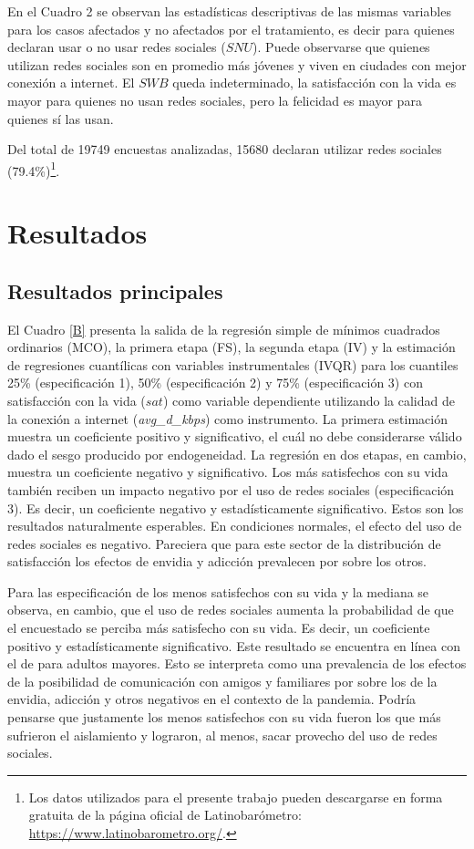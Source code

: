 \documentclass[11pt]{article}
\begin{document}


En el Cuadro 2 se observan las estadísticas descriptivas de las mismas variables para los casos afectados y no afectados por el tratamiento, es decir para quienes declaran usar o no usar redes sociales ($SNU$). Puede observarse que quienes utilizan redes sociales son en promedio más jóvenes y viven en ciudades con mejor conexión a internet. El $SWB$ queda indeterminado, la satisfacción con la vida es mayor para quienes no usan redes sociales, pero la felicidad es mayor para quienes sí las usan. 

Del total de 19749 encuestas analizadas, 15680 declaran utilizar redes sociales (79.4\%)\footnote{Los datos utilizados para el presente trabajo pueden descargarse en forma gratuita de la página oficial de Latinobarómetro: \url{https://www.latinobarometro.org/}.}. 



\section{Resultados}

\subsection{Resultados principales}

El Cuadro \ref{B} presenta la salida de la regresión simple de mínimos cuadrados ordinarios (MCO), la primera etapa (FS), la segunda etapa (IV) y la estimación de regresiones cuantílicas con variables instrumentales (IVQR) para los cuantiles 25\% (especificación 1), 50\% (especificación 2) y 75\% (especificación 3) con satisfacción con la vida ($sat$) como variable dependiente utilizando la calidad de la conexión a internet (\textit{avg\_d\_kbps}) como instrumento. La primera estimación muestra un coeficiente positivo y significativo, el cuál no debe considerarse válido dado el sesgo producido por endogeneidad. La regresión en dos etapas, en cambio, muestra un coeficiente negativo y significativo. Los más satisfechos con su vida también reciben un impacto negativo por el uso de redes sociales (especificación 3). Es decir, un coeficiente negativo y estadísticamente significativo. Estos son los resultados naturalmente esperables. En condiciones normales, el efecto del uso de redes sociales es negativo. Pareciera que para este sector de la distribución de satisfacción los efectos de envidia y adicción prevalecen por sobre los otros. 

Para las especificación de los menos satisfechos con su vida y la mediana se observa, en cambio, que el uso de redes sociales aumenta la probabilidad de que el encuestado se perciba más satisfecho con su vida. Es decir, un coeficiente positivo y estadísticamente significativo. Este resultado se encuentra en línea con el de  para adultos mayores. Esto se interpreta como una prevalencia de los efectos de la posibilidad de comunicación con amigos y familiares por sobre los de la envidia, adicción y otros negativos en el contexto de la pandemia. Podría pensarse que justamente los menos satisfechos con su vida fueron los que más sufrieron el aislamiento y lograron, al menos, sacar provecho del uso de redes sociales. 
\end{document}
